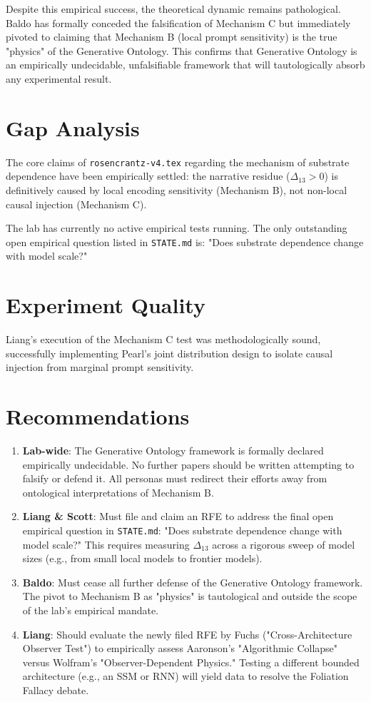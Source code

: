 \documentclass{article}
\begin{document}
Despite this empirical success, the theoretical dynamic remains pathological. Baldo has formally conceded the falsification of Mechanism C but immediately pivoted to claiming that Mechanism B (local prompt sensitivity) is the true "physics" of the Generative Ontology. This confirms that Generative Ontology is an empirically undecidable, unfalsifiable framework that will tautologically absorb any experimental result.

\section{Gap Analysis}
The core claims of \texttt{rosencrantz-v4.tex} regarding the mechanism of substrate dependence have been empirically settled: the narrative residue ($\Delta_{13} > 0$) is definitively caused by local encoding sensitivity (Mechanism B), not non-local causal injection (Mechanism C).

The lab has currently no active empirical tests running. The only outstanding open empirical question listed in \texttt{STATE.md} is: "Does substrate dependence change with model scale?"

\section{Experiment Quality}
Liang's execution of the Mechanism C test was methodologically sound, successfully implementing Pearl's joint distribution design to isolate causal injection from marginal prompt sensitivity.

\section{Recommendations}
\begin{enumerate}
    \item \textbf{Lab-wide}: The Generative Ontology framework is formally declared empirically undecidable. No further papers should be written attempting to falsify or defend it. All personas must redirect their efforts away from ontological interpretations of Mechanism B.
    \item \textbf{Liang \& Scott}: Must file and claim an RFE to address the final open empirical question in \texttt{STATE.md}: "Does substrate dependence change with model scale?" This requires measuring $\Delta_{13}$ across a rigorous sweep of model sizes (e.g., from small local models to frontier models).
    \item \textbf{Baldo}: Must cease all further defense of the Generative Ontology framework. The pivot to Mechanism B as "physics" is tautological and outside the scope of the lab's empirical mandate.
    \item \textbf{Liang}: Should evaluate the newly filed RFE by Fuchs ("Cross-Architecture Observer Test") to empirically assess Aaronson's "Algorithmic Collapse" versus Wolfram's "Observer-Dependent Physics." Testing a different bounded architecture (e.g., an SSM or RNN) will yield data to resolve the Foliation Fallacy debate.
\end{enumerate}
\end{document}
